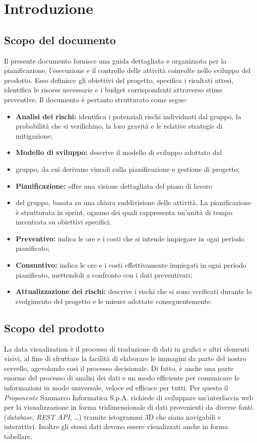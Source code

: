 \section{Introduzione}
\subsection{Scopo del documento}
Il presente documento fornisce una guida dettagliata e organizzata per la
pianificazione, l'esecuzione e il controllo delle attività coinvolte nello
sviluppo del prodotto. Esso definisce gli obiettivi del progetto, specifica i
risultati attesi, identifica le risorse necessarie e i budget corrispondenti
attraverso stime preventive. Il documento è pertanto strutturato come segue:
\begin{itemize}
    \item \textbf{Analisi dei rischi:} identifica i potenziali rischi individuati
          dal gruppo, la probabilità che si verifichino, la loro gravità e le relative
          strategie di mitigazione;
    \item \textbf{Modello di sviluppo:} descrive il modello di sviluppo adottato dal
    \item gruppo, da cui derivano vincoli sulla pianificazione e gestione di progetto;
    \item \textbf{Pianificazione:} offre una visione dettagliata del piano di lavoro
    \item del gruppo, basata su una chiara suddivisione delle attività. La pianificazione
          è strutturata in sprint, ognuno dei quali rappresenta un'unità di tempo
          incentrata su obiettivi specifici;
    \item \textbf{Preventivo:} indica le ore e i costi che si intende impiegare
          in ogni periodo pianificato;
    \item \textbf{Consuntivo:} indica le ore e i costi effettivamente impiegati
          in ogni periodo pianificato, mettendoli a confronto con i dati preventivati;
    \item \textbf{Attualizzazione dei rischi:} descrive i rischi che si sono verificati
          durante lo svolgimento del progetto e le misure adottate conseguentemente.
\end{itemize}

\subsection{Scopo del prodotto}
La data visualization è il processo di traduzione di dati in grafici e altri
elementi visivi, al fine di sfruttare la facilità di elaborare le immagini da
parte del nostro cervello, agevolando così il processo decisionale. Di fatto, è
anche una parte enorme del processo di analisi dei dati e un modo efficiente
per comunicare le informazioni in modo universale, veloce ed efficace per
tutti. Per questo il \textit{Proponente} Sanmarco Informatica S.p.A. richiede
di sviluppare un'interfaccia web per la visualizzazione in forma
tridimensionale di dati provenienti da diverse fonti (\textit{database},
\textit{REST API}, \dots) tramite istogrammi 3D che siano navigabili e
interattivi. Inoltre gli stessi dati devono essere visualizzati anche in forma
tabellare.
